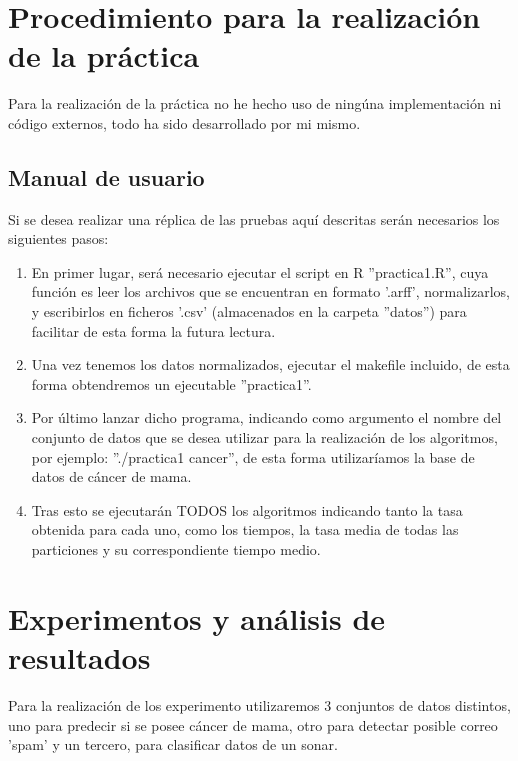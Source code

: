 \section{Procedimiento para la realización de la práctica}
Para la realización de la práctica no he hecho uso de ningúna implementación ni código externos, todo ha sido desarrollado por mi mismo.\\ 

\subsection{Manual de usuario}
Si se desea realizar una réplica de las pruebas aquí descritas serán necesarios los siguientes pasos:

\begin{enumerate}
	\item En primer lugar, será necesario ejecutar el script en R ''practica1.R'', cuya función es leer los archivos que se encuentran en formato '.arff', normalizarlos, y escribirlos en ficheros '.csv' (almacenados en la carpeta ''datos'') para facilitar de esta forma la futura lectura.
	
	\item Una vez tenemos los datos normalizados, ejecutar el makefile incluido, de esta forma obtendremos un ejecutable ''practica1''.
	
	\item Por último lanzar dicho programa, indicando como argumento el nombre del conjunto de datos que se desea utilizar para la realización de los algoritmos, por ejemplo: ''./practica1 cancer'', de esta forma utilizaríamos la base de datos de cáncer de mama.
	
	\item Tras esto se ejecutarán TODOS los algoritmos indicando tanto la tasa obtenida para cada uno, como los tiempos, la tasa media de todas las particiones y su correspondiente tiempo medio.
\end{enumerate}


\section{Experimentos y análisis de resultados}

Para la realización de los experimento utilizaremos 3 conjuntos de datos distintos, uno para predecir si se posee cáncer de mama, otro para detectar posible correo 'spam' y un tercero, para clasificar datos de un sonar.\\ 

